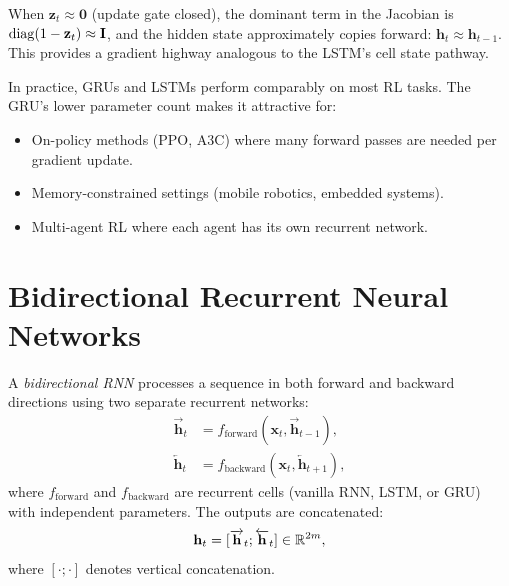 \documentclass[11pt,a4paper]{article}
\begin{document}
\begin{corollary}
\label{cor:gru-gradient}
When $\mathbf{z}_t \approx \mathbf{0}$ (update gate closed), the
dominant term in the Jacobian is $\operatorname{diag}(1 - \mathbf{z}_t) \approx
\mathbf{I}$, and the hidden state approximately copies forward:
$\mathbf{h}_t \approx \mathbf{h}_{t-1}$.  This provides a gradient
highway analogous to the LSTM's cell state pathway.
\end{corollary}

\begin{rlconnection}[title={GRU in Deep RL}]
In practice, GRUs and LSTMs perform comparably on most RL tasks.
The GRU's lower parameter count makes it attractive for:
\begin{itemize}[nosep]
  \item On-policy methods (PPO, A3C) where many forward passes are
    needed per gradient update.
  \item Memory-constrained settings (mobile robotics, embedded
    systems).
  \item Multi-agent RL where each agent has its own recurrent
    network.
\end{itemize}
\end{rlconnection}

\section{Bidirectional Recurrent Neural Networks}
\label{sec:bidirectional}

\begin{definition}
\label{def:bidirectional}
A \emph{bidirectional RNN} processes a sequence in both forward and
backward directions using two separate recurrent networks:
\begin{align}
  \overrightarrow{\mathbf{h}}_t &= f_{\text{forward}}(\mathbf{x}_t,
    \overrightarrow{\mathbf{h}}_{t-1}),
    \label{eq:bidir-forward} \\
  \overleftarrow{\mathbf{h}}_t &= f_{\text{backward}}(\mathbf{x}_t,
    \overleftarrow{\mathbf{h}}_{t+1}),
    \label{eq:bidir-backward}
\end{align}
where $f_{\text{forward}}$ and $f_{\text{backward}}$ are recurrent
cells (vanilla RNN, LSTM, or GRU) with independent parameters.
The outputs are concatenated:
\begin{equation}
  \mathbf{h}_t = [\overrightarrow{\mathbf{h}}_t;
    \overleftarrow{\mathbf{h}}_t] \in \mathbb{R}^{2m},
  \label{eq:bidir-concat}
\end{equation}
where $[\cdot;\cdot]$ denotes vertical concatenation.
\end{definition}
\end{document}
